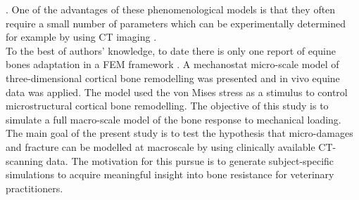 \documentclass[11pt]{ACMEarticle}
\numberwithin{equation}{section}
\begin{document}
\citep{waffenschmidt2012application}. 
One of the advantages of these phenomenological models is that they often require a small number of parameters which can be experimentally
 determined for example by using CT imaging \citep{zadpoor2013open}.
\\ 
To the best of authors' knowledge, to date there is only one report of equine bones adaptation in a FEM framework \citep{Wang2016}. 
A mechanostat micro-scale model of three-dimensional cortical bone remodelling was presented and in vivo equine data was applied. 
The model used the von Mises stress as a stimulus to control microstructural cortical bone remodelling.
The objective of this study is to simulate a full macro-scale model of the bone response to mechanical loading. 
The main goal of the present study is to test the hypothesis that micro-damages and fracture can be modelled at macroscale 
by using clinically available CT-scanning data.
The motivation for this pursue is to generate subject-specific simulations to acquire meaningful insight into bone resistance
 for veterinary practitioners.
\end{document}
